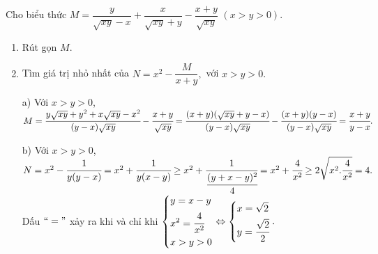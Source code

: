 \begin{ex}%
	Cho biểu thức $M=\dfrac{y}{\sqrt{xy}-x}+\dfrac{x}{\sqrt{xy}+y}-\dfrac{x+y}{\sqrt{xy}}$ $\left(x>y>0 \right). $
	\begin{enumerate}
		\item Rút gọn $M.$
		\item Tìm giá trị nhỏ nhất của $N=x^2-\dfrac{M}{x+y},$ với $x>y>0.$
	\end{enumerate}
\loigiai
{\begin{enumerate}
		\item[a)] Với $ x>y>0 $,
		\\$ M=\cfrac{y\sqrt{xy}+y^2+x\sqrt{xy}-x^2}{(y-x)\sqrt{xy}}-\cfrac{x+y}{\sqrt{xy}}=\cfrac{(x+y)(\sqrt{xy}+y-x)}{(y-x)\sqrt{xy}}-\cfrac{(x+y)(y-x)}{(y-x)\sqrt{xy}}=\cfrac{x+y}{y-x}. $
		\item[b)] Với $ x>y>0 $,
		\\ $ N=x^2-\cfrac{1}{y(y-x)}=x^2+\cfrac{1}{y(x-y)}\ge x^2+\cfrac{1}{\cfrac{(y+x-y)^2}{4}}=x^2+\cfrac{4}{x^2} \ge 2\sqrt{x^2.\cfrac{4}{x^2}}=4 .$
		\\	Dấu $ ``=" $ xảy ra khi và chỉ khi $ \left\{\begin{aligned}&y=x-y\\&x^2=\cfrac{4}{x^2}\\&x>y>0\end{aligned}\right. \Leftrightarrow \left\{\begin{aligned}&x=\sqrt{2} \\&y=\cfrac{\sqrt{2}}{2}\end{aligned}\right.. $
\end{enumerate}}
\end{ex}

